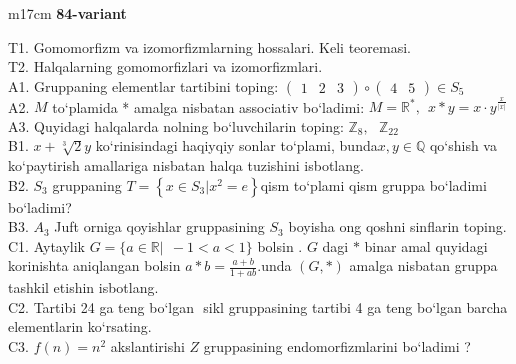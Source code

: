\documentclass{article}
\begin{document}
\begin{tabular}{m{17cm}}
\textbf{84-variant}
\newline

T1. Gomomorfizm va izomorfizmlarning hossalari. Keli teoremasi. \\
T2. Halqalarning gomomorfizlari va izomorfizmlari. \\
A1. Gruppaning elementlar tartibini toping: \(\begin{pmatrix}
1 & 2 & 3
\end{pmatrix} \circ \begin{pmatrix}
4 & 5
\end{pmatrix} \in S_{5}\) \\
A2. \(M\) to`plamida * amalga nisbatan associativ bo`ladimi: \(M = \mathbb{R}^{*},\ \ x*y = x \cdot y^{\frac{x}{|x|}}\) \\
A3. Quyidagi halqalarda nolning bo`luvchilarin toping: \(\mathbb{Z}_{8},\ \ \ \mathbb{Z}_{22}\) \\
B1. \(x + \sqrt[3]{2}y\) ko`rinisindagi haqiyqiy sonlar to`plami, bunda\(x,y\mathbb{\in Q}\) qo`shish va ko`paytirish amallariga nisbatan halqa tuzishini isbotlang. \\
B2. \(S_{3}\) gruppaning \(T = \left\{ x \in S_{3}|x^{2} = e \right\}\)qism to`plami qism gruppa bo`ladimi bo`ladimi? \\
B3. \(A_{3}\) Juft orniga qoyishlar gruppasining \(S_{3}\) boyisha o\textquotesingle ng qo\textquotesingle shni sinflarin toping. \\
C1. Aytaylik \(G = \{ a\mathbb{\in R}|\ \  - 1 < a < 1\}\) bo\textquotesingle lsin . \(G\) dagi \(*\) binar amal quyidagi ko\textquotesingle rinishta aniqlangan bo\textquotesingle lsin \(a*b = \frac{a + b}{1 + ab}.\)unda \((G,*)\) amalga nisbatan gruppa tashkil etishin isbotlang. \\
C2. Tartibi 24 ga teng bo`lgan \(< a >\) sikl gruppasining tartibi 4 ga teng bo`lgan barcha elementlarin ko`rsating. \\
C3. \(f(n) = n^{2}\) akslantirishi \(Z\) gruppasining endomorfizmlarini bo`ladimi ? \\

\end{tabular}
\vspace{1cm}
\end{document}
